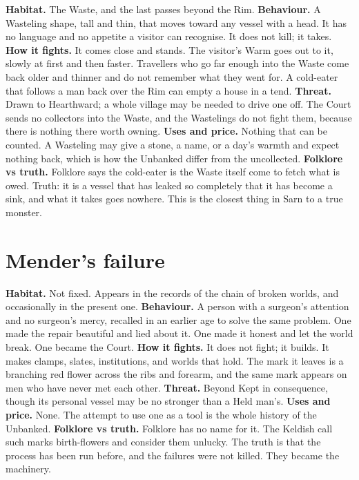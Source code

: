 \documentclass{design/chronicle}
\begin{document}
\textbf{Habitat.} The Waste, and the last passes beyond the Rim. \textbf{Behaviour.} A Wasteling shape, tall and thin, that moves toward any vessel with a head. It has no language and no appetite a visitor can recognise. It does not kill; it takes. \textbf{How it fights.} It comes close and stands. The visitor’s Warm goes out to it, slowly at first and then faster. Travellers who go far enough into the Waste come back older and thinner and do not remember what they went for. A cold-eater that follows a man back over the Rim can empty a house in a tend. \textbf{Threat.} Drawn to Hearthward; a whole village may be needed to drive one off. The Court sends no collectors into the Waste, and the Wastelings do not fight them, because there is nothing there worth owning. \textbf{Uses and price.} Nothing that can be counted. A Wasteling may give a stone, a name, or a day’s warmth and expect nothing back, which is how the Unbanked differ from the uncollected. \textbf{Folklore vs truth.} Folklore says the cold-eater is the Waste itself come to fetch what is owed. Truth: it is a vessel that has leaked so completely that it has become a sink, and what it takes goes nowhere. This is the closest thing in Sarn to a true monster.

\section*{Mender’s failure}

\textbf{Habitat.} Not fixed. Appears in the records of the chain of broken worlds, and occasionally in the present one. \textbf{Behaviour.} A person with a surgeon’s attention and no surgeon’s mercy, recalled in an earlier age to solve the same problem. One made the repair beautiful and lied about it. One made it honest and let the world break. One became the Court. \textbf{How it fights.} It does not fight; it builds. It makes clamps, slates, institutions, and worlds that hold. The mark it leaves is a branching red flower across the ribs and forearm, and the same mark appears on men who have never met each other. \textbf{Threat.} Beyond Kept in consequence, though its personal vessel may be no stronger than a Held man’s. \textbf{Uses and price.} None. The attempt to use one as a tool is the whole history of the Unbanked. \textbf{Folklore vs truth.} Folklore has no name for it. The Keldish call such marks birth-flowers and consider them unlucky. The truth is that the process has been run before, and the failures were not killed. They became the machinery.
\end{document}
